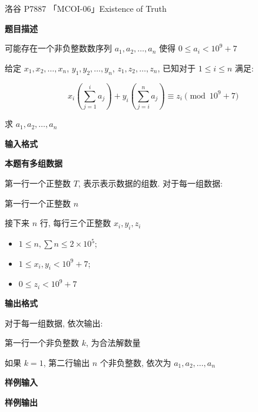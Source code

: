 \begin{frame}{洛谷 P7887 「MCOI-06」Existence of Truth}
	\label{cgrunt:example:lgp7887}

	\textbf{题目描述}

	可能存在一个非负整数数序列 \(a_1,a_2,\dots,a_n\) 使得 \(0\le a_i<10^9+7\)

	给定 \(x_1,x_2,\dots,x_n\), \(y_1,y_2,\dots,y_n\), \(z_1,z_2,\dots,z_n\), 已知对于 \(1\le i\le n\) 满足:

	\begin{equation}
		\label{cgrunt:eq:lgp7887}
		x_i\left(\sum_{j=1}^ia_j\right)+y_i\left(\sum_{j=i}^na_j\right)\equiv z_i\pmod{10^9+7}
	\end{equation}

	求 \(a_1,a_2,\dots,a_n\)

	\textbf{输入格式}

	\textbf{本题有多组数据}

	第一行一个正整数 \(T\), 表示表示数据的组数. 对于每一组数据:

	第一行一个正整数 \(n\)

	接下来 \(n\) 行, 每行三个正整数 \(x_i,y_i,z_i\)

	\begin{itemize}
		\item \(1\le n,\sum n\le 2\times10^5\);
		\item \(1\le x_i,y_i<10^9+7\);
		\item \(0\le z_i<10^9+7\)
	\end{itemize}

	\textbf{输出格式}

	对于每一组数据, 依次输出:

	第一行一个非负整数 \(k\), 为合法解数量

	如果 \(k=1\), 第二行输出 \(n\) 个非负整数, 依次为 \(a_1,a_2,\dots,a_n\)

	\textbf{样例输入}


	\textbf{样例输出}

\end{frame}


